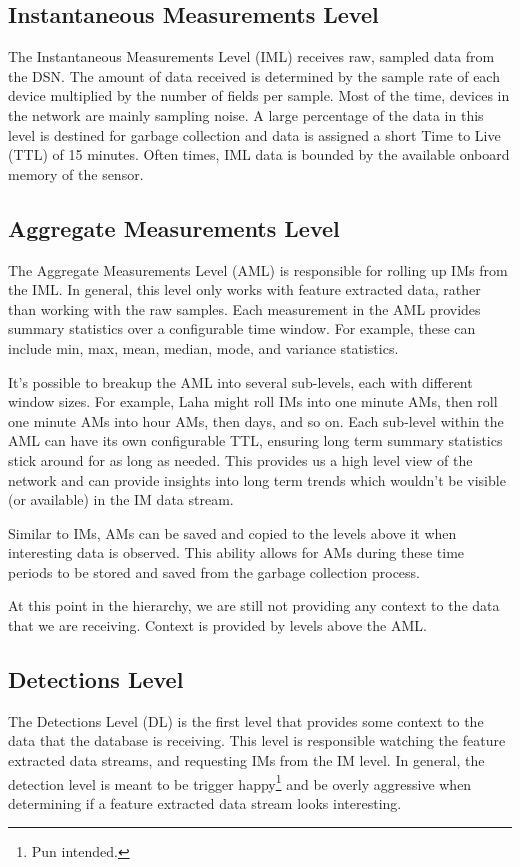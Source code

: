 \subsection{Instantaneous Measurements Level}\label{subsec:instantaneous-measurements-level}
The Instantaneous Measurements Level (IML) receives raw, sampled data from the DSN. The amount of data received is determined by the sample rate of each device multiplied by the number of fields per sample. Most of the time, devices in the network are mainly sampling noise. A large percentage of the data in this level is destined for garbage collection and data is assigned a short Time to Live (TTL) of 15 minutes. Often times, IML data is bounded by the available onboard memory of the sensor.

\subsection{Aggregate Measurements Level}\label{subsec:aggregate-measurements-level}
The Aggregate Measurements Level (AML) is responsible for rolling up IMs from the IML. In general, this level only works with feature extracted data, rather than working with the raw samples. Each measurement in the AML provides summary statistics over a configurable time window. For example, these can include min, max, mean, median, mode, and variance statistics.

It's possible to breakup the AML into several sub-levels, each with different window sizes. For example, Laha might roll IMs into one minute AMs, then roll one minute AMs into hour AMs, then days, and so on. Each sub-level within the AML can have its own configurable TTL, ensuring long term summary statistics stick around for as long as needed. This provides us a high level view of the network and can provide insights into long term trends which wouldn't be visible (or available) in the IM data stream.

Similar to IMs, AMs can be saved and copied to the levels above it when interesting data is observed. This ability allows for AMs during these time periods to be stored and saved from the garbage collection process.

At this point in the hierarchy, we are still not providing any context to the data that we are receiving. Context is provided by levels above the AML\@.

\subsection{Detections Level}\label{subsec:detections-level}
The Detections Level (DL) is the first level that provides some context to the data that the database is receiving. This level is responsible watching the feature extracted data streams, and requesting IMs from the IM level. In general, the detection level is meant to be trigger happy\footnote{Pun intended.} and be overly aggressive when determining if a feature extracted data stream looks interesting.

